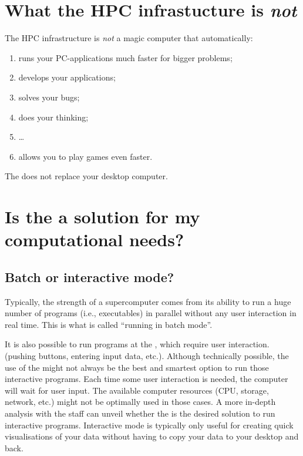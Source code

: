 \section{What the HPC infrastucture is \emph{not}}
\label{sec:what-is-the-hpc-not}

The HPC infrastructure is \emph{not} a magic computer that automatically:
\begin{enumerate}
  \item  runs your PC-applications much faster for bigger problems;
  \item  develops your applications;
  \item  solves your bugs;
  \item  does your thinking;
  \item  \dots
  \item  allows you to play games even faster.
\end{enumerate}
The \hpc does not replace your desktop computer.

\section{Is the \hpc a solution for my computational needs?}
\label{sec:is-the-hpc-a-solution-for-my-computational-needs}

\subsection{Batch or interactive mode?}
\label{sec:batch-or-interactive-mode}

Typically, the strength of a supercomputer comes from its ability to run a huge
number of programs (i.e., executables) in parallel without any user interaction
in real time. This is what is called ``running in batch mode''.

It is also possible to run programs at the \hpc, which require user
interaction. (pushing buttons, entering input data, etc.).  Although
technically possible, the use of the \hpc might not always be the best and
smartest option to run those interactive programs.  Each time some user
interaction is needed, the computer will wait for user input. The available
computer resources (CPU, storage, network, etc.) might not be optimally used in
those cases. A more in-depth analysis with the \hpc staff can unveil whether
the \hpc is the desired solution to run interactive programs.
Interactive mode is typically only useful for creating quick visualisations
of your data without having to copy your data to your desktop and back.

